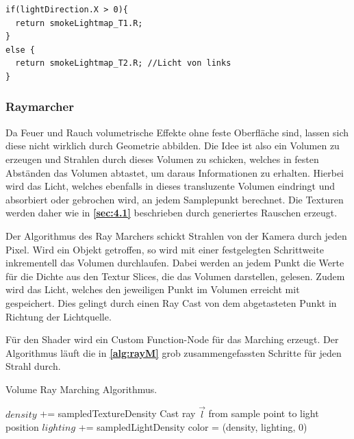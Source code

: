 \vspace{.6cm}
\begin{lstlisting}[language={[Sharp]C}, label={lst:lightMapLogik}, caption={Logik zur Auswahl der richtigen Lightmap am Beispiel der X-Richtung des Lichts.},captionpos=b, frame=single]
if(lightDirection.X > 0){
  return smokeLightmap_T1.R; 
}
else {
  return smokeLightmap_T2.R; //Licht von links
}

\end{lstlisting}


\subsubsection{Raymarcher}

Da Feuer und Rauch volumetrische Effekte ohne feste Oberfläche sind, lassen sich diese nicht wirklich durch Geometrie abbilden. Die Idee ist also ein
Volumen zu erzeugen und Strahlen durch dieses Volumen zu schicken, welches in festen Abständen das Volumen abtastet, um daraus Informationen zu erhalten.
Hierbei wird das Licht, welches ebenfalls in dieses transluzente Volumen eindringt und absorbiert oder gebrochen wird, an jedem Samplepunkt berechnet.
Die Texturen werden daher wie in \textbf{\autoref{sec:4.1}} beschrieben durch generiertes Rauschen erzeugt.

Der Algorithmus des Ray Marchers schickt Strahlen von der Kamera durch jeden Pixel. Wird ein Objekt getroffen, so wird mit einer festgelegten Schrittweite
inkrementell das Volumen durchlaufen. Dabei werden an jedem Punkt die Werte für die Dichte aus den Textur Slices, die das Volumen darstellen, gelesen. Zudem
wird das Licht, welches den jeweiligen Punkt im Volumen erreicht mit gespeichert. Dies gelingt durch einen Ray Cast von dem abgetasteten Punkt in Richtung der Lichtquelle.

Für den Shader wird ein Custom Function-Node für das Marching erzeugt. Der Algorithmus läuft die in \textbf{\autoref{alg:rayM}} grob zusammengefassten Schritte für jeden Strahl durch.


\begin{algorithm}
	\caption{Volume Ray Marching Algorithmus.}\label{alg:rayM}
	\begin{algorithmic}

		\State $density$ += sampledTextureDensity
		\State Cast ray $\vec{l}$ from sample point to light position
		\State $lighting$ += sampledLightDensity
		\EndFor
		\EndFor
		\State color = (density, lighting, 0)
	\end{algorithmic}
\end{algorithm}

